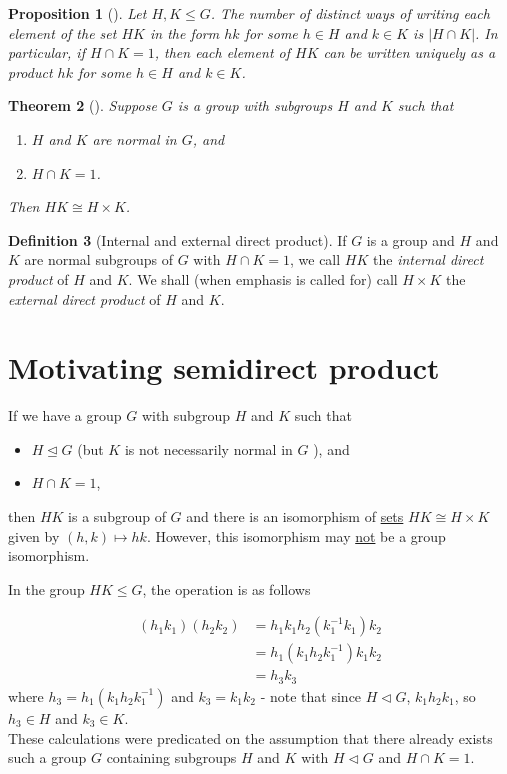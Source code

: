 \documentclass[reqno]{amsart}
\newtheorem{theorem}{Theorem}[section]
\newtheorem{proposition}[theorem]{Proposition}
\theoremstyle{definition}
\newtheorem{definition}[theorem]{Definition}
\theoremstyle{remark}
\begin{document}
\begin{proposition}[]
    Let $H,K \le G$. The number of distinct ways of writing each element
    of the set $HK$ in the form $hk$ for some $h \in H$ and $k \in K$ is
    $\left| H \cap K \right| $. In particular, if $H \cap K = 1$, then
    each element of $HK$ can be written uniquely as a product  $hk$ for
    some  $h \in H$ and $k \in K$.
\end{proposition}

\begin{theorem}[]
    Suppose $G$ is a group with subgroups $H$ and $K$ such that
    \begin{enumerate}
        \item $H$ and $K$ are normal in $G$, and
        \item $H \cap K = 1$.
    \end{enumerate}
    Then $HK \cong H \times K$.
\end{theorem}

\begin{definition}[Internal and external direct product]
    If $G$ is a group and $H$ and $K$ are normal subgroups of $G$ with
    $H \cap K = 1$, we call $HK$ the \textit{internal direct product} of
    $H$ and $K$. We shall (when emphasis is called for) call
    $H \times K$ the \textit{external direct product} of $H$ and $K$.
\end{definition}





\section{Motivating semidirect product}
If we have a group $G$ with subgroup $H$ and $K$ such that
\begin{itemize}
    \item $H \trianglelefteq G$ (but $K$ is not necessarily normal in $G$ ), and
    \item $H \cap K = 1$,
\end{itemize}
then $HK$ is a subgroup of $G$ and there is an isomorphism of \underline{sets}
$HK \cong H \times K$ given by
$(h,k) \mapsto hk$. However, this isomorphism
may \underline{not} be a group isomorphism.

In the group $HK \le G$, the operation is as follows

\begin{align*}
    \left( h_1 k_1 \right) \left( h_2 k_2 \right) 
    &= h_1 k_1 h_2 \left( k_1^{-1} k_1 \right) k_2\\
    &= h_1 \left( k_1 h_2 k_1^{-1} \right) k_1 k_2 \label{eq:Omega} \tag{$\Omega$}\\
    &= h_3 k_3
\end{align*}
where $h_3 = h_1 \left( k_1 h_2 k_1^{-1} \right) $ and
$k_3 = k_1 k_2$ - note that since $H \triangleleft G$, $k_1 h_2 k_1$, so
$h_3 \in H$ and $k_3 \in K$.\\
\linebreak
These calculations were predicated on the assumption that there already exists
such a group $G$ containing subgroups $H$ and $K$ with
$H \triangleleft G$ and $H \cap K = 1$.
\end{document}
